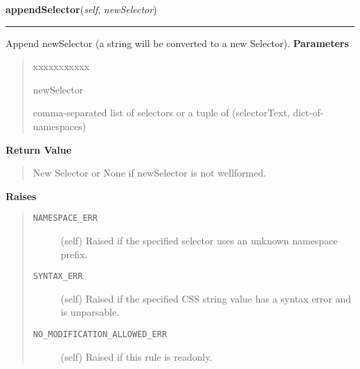 \hspace{.8\funcindent}\begin{boxedminipage}{\funcwidth}

    \raggedright \textbf{appendSelector}(\textit{self}, \textit{newSelector})

    \vspace{-1.5ex}

    \rule{\textwidth}{0.5\fboxrule}
\setlength{\parskip}{2ex}

Append newSelector (a string will be converted to a new
Selector).
\setlength{\parskip}{1ex}
      \textbf{Parameters}
      \vspace{-1ex}

      \begin{quote}
        \begin{Ventry}{xxxxxxxxxxx}

          \item[newSelector]


comma-separated list of selectors or a tuple of
(selectorText, dict-of-namespaces)
        \end{Ventry}

      \end{quote}

      \textbf{Return Value}
    \vspace{-1ex}

      \begin{quote}

New Selector or None if newSelector is not wellformed.
      \end{quote}

      \textbf{Raises}
    \vspace{-1ex}

      \begin{quote}
        \begin{description}

          \item[\texttt{NAMESPACE\_ERR}]


(self)
Raised if the specified selector uses an unknown namespace
prefix.
          \item[\texttt{SYNTAX\_ERR}]


(self)
Raised if the specified CSS string value has a syntax error
and is unparsable.
          \item[\texttt{NO\_MODIFICATION\_ALLOWED\_ERR}]


(self)
Raised if this rule is readonly.
        \end{description}

      \end{quote}

    \end{boxedminipage}

